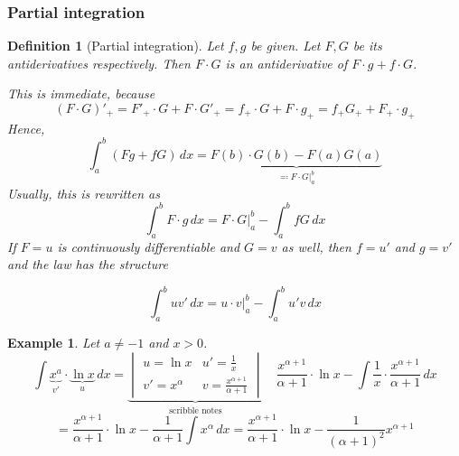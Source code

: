 \documentclass{article}
\newtheorem{example}{Example}  \numberwithin{example}{section}
\newtheorem{definition}{Definition}  \numberwithin{definition}{section}
\begin{document}
\subsubsection{Partial integration}

\begin{definition}[Partial integration]
  Let $f, g$ be given. Let $F, G$ be its antiderivatives respectively.
  Then $F \cdot G$ is an antiderivative of $F \cdot g + f \cdot G$.

  This is immediate, because
  \[
    (F \cdot G)'_+ = F'_+ \cdot G + F \cdot G'_+
    = f_+ \cdot G + F \cdot g_+ = f_+ G_+ + F_+ \cdot g_+
  \]
  Hence,
  \[
    \int_a^b (F g + f G) \, dx
    = \underbrace{F(b) \cdot G(b) - F(a) G(a)}_{\eqqcolon \left.F \cdot G\right|_a^b}
  \]
  Usually, this is rewritten as
  \[ \int_a^b F \cdot g \, dx = \left. F \cdot G\right|_a^b - \int_a^b f G \, dx \]
  If $F = u$ is continuously differentiable and $G = v$ as well,
  then $f = u'$ and $g = v'$ and the law has the structure
  \begin{framed}
    \[ \int_a^b uv' \, dx = \left.u\cdot v\right|_a^b - \int_a^b u'v \, dx \]
  \end{framed}
\end{definition}

\begin{example}
  Let $a \neq -1$ and $x > 0$.
  \[
    \int \underbrace{x^a}_{v'} \cdot \underbrace{\ln{x}}_{u} \, dx =
    \underbrace{\begin{vmatrix}
      u = \ln{x} & u' = \frac1x \\
      v' = x^\alpha & v = \frac{x^{\alpha+1}}{\alpha + 1}
    \end{vmatrix}}_{\text{scribble notes}}
    \quad
    \frac{x^{\alpha + 1}}{\alpha + 1} \cdot \ln{x} - \int \frac1{x} \cdot \frac{x^{\alpha+1}}{\alpha + 1} \, dx
  \] \[
    = \frac{x^{\alpha+1}}{\alpha + 1} \cdot \ln{x} - \frac{1}{\alpha + 1} \int x^\alpha \, dx
    = \frac{x^{\alpha+1}}{\alpha + 1} \cdot \ln{x} - \frac{1}{(\alpha + 1)^2} x^{\alpha+1}
  \]
\end{example}
\end{document}
